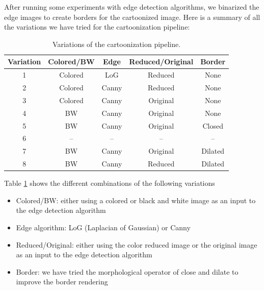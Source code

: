\documentclass[]{IEEEtran}
\begin{document}
    After running some experiments with edge detection algorithms, we binarized the edge images to create borders
    for the cartoonized image. Here is a summary of all the variations we have tried for the cartoonization pipeline:

    \begin{table}[h]
    \centering
        \begin{tabular}{|c c c c c|}
        \hline
            Variation & Colored/BW & Edge & Reduced/Original & Border\\
            \hline\hline
            1 & Colored & LoG & Reduced & None\\
            \hline
            2 & Colored & Canny & Reduced & None\\
            \hline
            3 & Colored & Canny & Original & None\\
            \hline
            4 & BW & Canny & Original & None\\
            \hline
            5 & BW & Canny & Original & Closed\\
            \hline
            6 & -- & -- & -- & --\\
            \hline
            7 & BW & Canny & Original & Dilated\\
            \hline
            8 & BW & Canny & Reduced & Dilated\\
        \hline
        \end{tabular}
        \vspace{1pt}
        \caption{Variations of the cartoonization pipeline.}
        \label{table:variations}
        \vspace{-5pt}
    \end{table}

    Table \ref{table:variations} shows the different combinations of the following variations
    \begin{itemize}
    \item Colored/BW: either using a colored or black and white image as an input to the edge detection algorithm
    \item Edge algorithm: LoG (Laplacian of Gaussian) or Canny
    \item Reduced/Original: either using the color reduced image or the original image as an input to the edge detection algorithm
    \item Border: we have tried the morphological operator of close and dilate to improve the border rendering
    \end{itemize}
\end{document}
